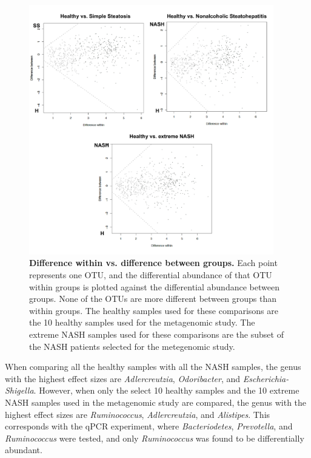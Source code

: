 \begin{figure}[h]
\begin{center}
\includegraphics[width=0.95\textwidth]{nafld_16s_aldex.png}
\caption[Difference within vs. difference between groups.]{\textbf{Difference within vs. difference between groups.} Each point represents one OTU, and the differential abundance of that OTU within groups is plotted against the differential abundance between groups. None of the OTUs are more different between groups than within groups. The healthy samples used for these comparisons are the 10 healthy samples used for the metagenomic study. The extreme NASH samples used for these comparisons are the subset of the NASH patients selected for the metegenomic study.}
\end{center}
\label{nafld_fig3}
\end{figure}

When comparing all the healthy samples with all the NASH samples, the genus with the highest effect sizes are \textit{Adlercreutzia}, \textit{Odoribacter}, and \textit{Escherichia-Shigella}. However, when only the select 10 healthy samples and the 10 extreme NASH samples used in the metagenomic study are compared, the genus with the highest effect sizes are \textit{Ruminococcus}, \textit{Adlercreutzia}, and \textit{Alistipes}. This corresponds with the qPCR experiment, where \textit{Bacteriodetes}, \textit{Prevotella}, and \textit{Ruminococcus} were tested, and only \textit{Ruminococcus} was found to be differentially abundant.

